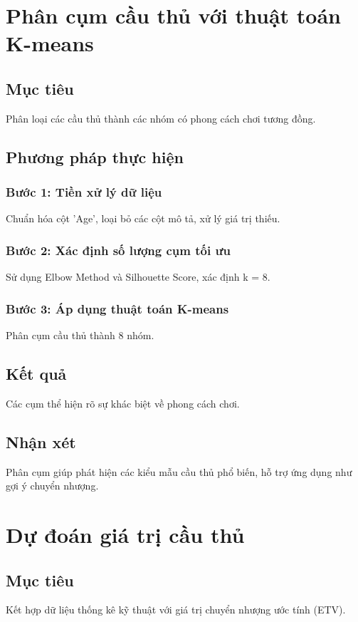 \documentclass[12pt,a4paper]{article}
\begin{document}
\section{Phân cụm cầu thủ với thuật toán K-means}

\subsection{Mục tiêu}
Phân loại các cầu thủ thành các nhóm có phong cách chơi tương đồng.

\subsection{Phương pháp thực hiện}

\subsubsection{Bước 1: Tiền xử lý dữ liệu}
Chuẩn hóa cột 'Age', loại bỏ các cột mô tả, xử lý giá trị thiếu.

\subsubsection{Bước 2: Xác định số lượng cụm tối ưu}
Sử dụng Elbow Method và Silhouette Score, xác định k = 8.

\subsubsection{Bước 3: Áp dụng thuật toán K-means}
Phân cụm cầu thủ thành 8 nhóm.

\subsection{Kết quả}
Các cụm thể hiện rõ sự khác biệt về phong cách chơi.

\subsection{Nhận xét}
Phân cụm giúp phát hiện các kiểu mẫu cầu thủ phổ biến, hỗ trợ ứng dụng như gợi ý chuyển nhượng.

\section{Dự đoán giá trị cầu thủ}

\subsection{Mục tiêu}
Kết hợp dữ liệu thống kê kỹ thuật với giá trị chuyển nhượng ước tính (ETV).
\end{document}
